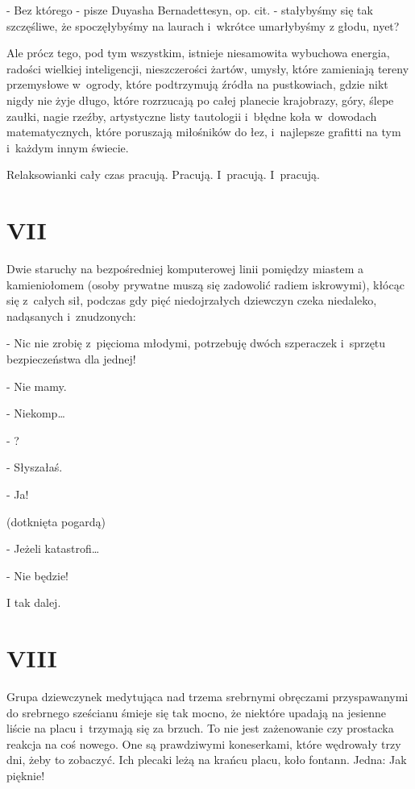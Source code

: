 \documentclass[oneside,polish,12pt,sfheadings]{mwbk}
\begin{document}
- Bez którego - pisze Duyasha Bernadettesyn, op. cit. - stałybyśmy
się tak szczęśliwe, że spoczęłybyśmy na laurach i~wkrótce umarłybyśmy
z głodu, nyet?

Ale prócz tego, pod tym wszystkim, istnieje niesamowita wybuchowa
energia, radości wielkiej inteligencji, nieszczerości żartów, umysły,
które zamieniają tereny przemysłowe w~ogrody, które podtrzymują źródła
na pustkowiach, gdzie nikt nigdy nie żyje długo, które rozrzucają
po całej planecie krajobrazy, góry, ślepe zaułki, nagie rzeźby, artystyczne
listy tautologii i~błędne koła w~dowodach matematycznych, które poruszają
miłośników do łez, i~najlepsze grafitti na tym i~każdym innym świecie.

Relaksowianki cały czas pracują. Pracują. I~pracują. I~pracują.

\chapter{VII}

Dwie staruchy na bezpośredniej komputerowej linii pomiędzy miastem
a kamieniołomem (osoby prywatne muszą się zadowolić radiem iskrowymi),
kłócąc się z~całych sił, podczas gdy pięć niedojrzałych dziewczyn
czeka niedaleko, nadąsanych i~znudzonych: 

- Nic nie zrobię z~pięcioma młodymi, potrzebuję dwóch szperaczek i~sprzętu bezpieczeństwa dla
jednej!

- Nie mamy.

- Niekomp\ldots

- ?

- Słyszałaś.

- Ja!

(dotknięta pogardą)

- Jeżeli katastrofi\ldots

- Nie będzie!

I tak dalej.

\chapter{VIII}

Grupa dziewczynek medytująca nad trzema srebrnymi obręczami przyspawanymi
do srebrnego sześcianu śmieje się tak mocno, że niektóre upadają na
jesienne liście na placu i~trzymają się za brzuch. To nie jest zażenowanie
czy prostacka reakcja na coś nowego. One są prawdziwymi koneserkami,
które wędrowały trzy dni, żeby to zobaczyć. Ich plecaki leżą na krańcu
placu, koło fontann. Jedna: Jak pięknie!
\end{document}

